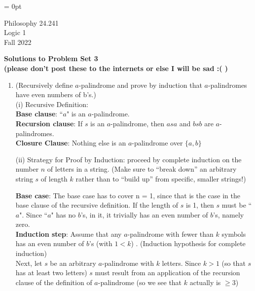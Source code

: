 \documentclass[12pt]{article}
\begin{document}
 


%
%
%
%

\thispagestyle{empty}
\parindent = 0pt
\hspace*{0in}\parbox[t]{2.5in}{
Philosophy 24.241\\[3pt]
Logic 1\\[3pt]
Fall 2022
}

\bigskip\bigskip


\begin{center}
\Large\bf Solutions to Problem Set 3 \\ \large (please don't post these to the internets or else I will be sad :( )
\end{center}

\begin{enumerate}

\item (Recursively define $a$-palindrome and prove by induction that $a$-palindromes
have even numbers of b's.)\\

\noindent (i) Recursive Definition: \\ \textbf{Base clause}: ``$a$" is an $a$-palindrome.\\
\textbf{Recursion clause}: If $s$ is an $a$-palindrome, then $asa$ and $bsb$
are $a$-palindromes.\\
\textbf{Closure Clause}: Nothing else is an $a$-palindrome over $\{a, b\}$

\noindent (ii) Strategy for Proof by Induction: proceed by complete induction on the number $n$ of letters in a string. (Make sure to ``break down'' an arbitrary string $s$ of length $k$ rather than to ``build up'' from specific, smaller strings!)

\noindent \textbf{Base case}: The base case has to cover
n = 1, since that is the case in the base clause of the recursive definition. If the length of $s$ is 1, then $s$ must be ``$a$".
Since ``$a$" has no $b$'s, in it, it trivially has an even number of
$b$'s, namely zero.\\

\noindent \textbf{Induction step}: Assume that any $a$-palindrome with fewer than $k$ symbols has an even number
of $b$'s (with $1<k$) . (Induction hypothesis for complete induction)\\

Next, let $s$ be an arbitrary $a$-palindrome with $k$ letters. Since $k > 1$ (so that $s$ has at least two letters) $s$
must result from
an application of the recursion clause of the definition of $a$-palindrome (so we see that $k$ actually is $\geq 3$)\\


\end{enumerate}
\end{document}
